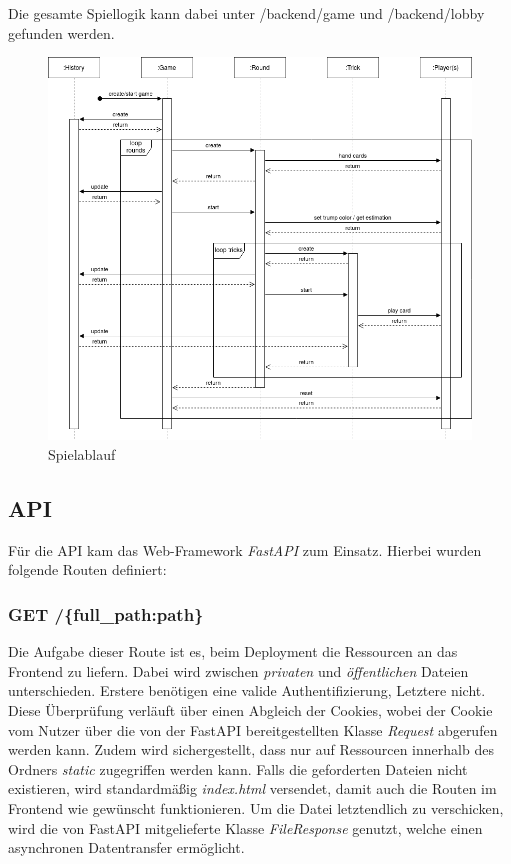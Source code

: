 Die gesamte Spiellogik kann dabei unter /backend/game und /backend/lobby gefunden werden.

\begin{figure}
	\includegraphics[width=\textwidth]{images/game-flow.png}
	\caption{Spielablauf}
	\label{fig:game-flow}
\end{figure}

\subsection{API}
Für die API kam das Web-Framework \textit{FastAPI} zum Einsatz. Hierbei wurden folgende Routen definiert:

\subsubsection{GET /\{full\_path:path\}}
Die Aufgabe dieser Route ist es, beim Deployment die Ressourcen an das Frontend zu liefern. Dabei wird zwischen \textit{privaten} und \textit{öffentlichen} Dateien unterschieden. Erstere benötigen eine valide Authentifizierung, Letztere nicht. Diese Überprüfung verläuft über einen Abgleich der Cookies, wobei der Cookie vom Nutzer über die von der FastAPI bereitgestellten Klasse \textit{Request} abgerufen werden kann. Zudem wird sichergestellt, dass nur auf Ressourcen innerhalb des Ordners \textit{static} zugegriffen werden kann. Falls die geforderten Dateien nicht existieren, wird standardmäßig \textit{index.html} versendet, damit auch die Routen im Frontend wie gewünscht funktionieren. Um die Datei letztendlich zu verschicken, wird die von FastAPI mitgelieferte Klasse \textit{FileResponse} genutzt, welche einen asynchronen Datentransfer ermöglicht. \cite{fastapi-fileresponse}

